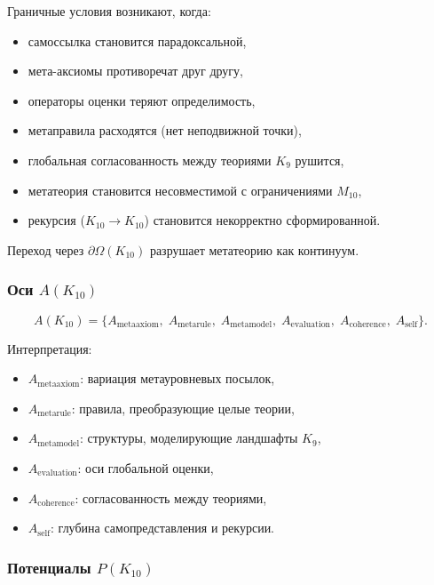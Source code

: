 Граничные условия возникают, когда:
\begin{itemize}
    \item самоссылка становится парадоксальной,
    \item мета-аксиомы противоречат друг другу,
    \item операторы оценки теряют определимость,
    \item метаправила расходятся (нет неподвижной точки),
    \item глобальная согласованность между теориями $K_9$ рушится,
    \item метатеория становится несовместимой с ограничениями $M_{10}$,
    \item рекурсия ($K_{10}\to K_{10}$) становится некорректно сформированной.
\end{itemize}

Переход через $\partial\Omega(K_{10})$ разрушает метатеорию как континуум.

\subsubsection{Оси $A(K_{10})$}

\[
A(K_{10})=
\{
A_{\mathrm{metaaxiom}},\;
A_{\mathrm{metarule}},\;
A_{\mathrm{metamodel}},\;
A_{\mathrm{evaluation}},\;
A_{\mathrm{coherence}},\;
A_{\mathrm{self}}
\}.
\]

Интерпретация:
\begin{itemize}
    \item $A_{\mathrm{metaaxiom}}$: вариация метауровневых посылок,
    \item $A_{\mathrm{metarule}}$: правила, преобразующие целые теории,
    \item $A_{\mathrm{metamodel}}$: структуры, моделирующие ландшафты $K_9$,
    \item $A_{\mathrm{evaluation}}$: оси глобальной оценки,
    \item $A_{\mathrm{coherence}}$: согласованность между теориями,
    \item $A_{\mathrm{self}}$: глубина самопредставления и рекурсии.
\end{itemize}

\subsubsection{Потенциалы $P(K_{10})$}

